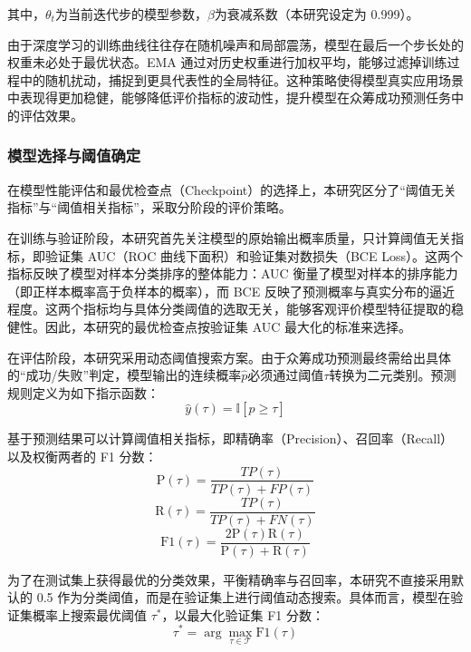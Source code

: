 其中，$ \theta_t $为当前迭代步的模型参数，$ \beta $为衰减系数（本研究设定为 0.999）。

由于深度学习的训练曲线往往存在随机噪声和局部震荡，模型在最后一个步长处的权重未必处于最优状态。EMA 通过对历史权重进行加权平均，能够过滤掉训练过程中的随机扰动，捕捉到更具代表性的全局特征。这种策略使得模型真实应用场景中表现得更加稳健，能够降低评价指标的波动性，提升模型在众筹成功预测任务中的评估效果。

\subsubsection{模型选择与阈值确定}

在模型性能评估和最优检查点（Checkpoint）的选择上，本研究区分了``阈值无关指标''与``阈值相关指标''，采取分阶段的评价策略。

在训练与验证阶段，本研究首先关注模型的原始输出概率质量，只计算阈值无关指标，即验证集 AUC（ROC 曲线下面积）和验证集对数损失（BCE Loss）。这两个指标反映了模型对样本分类排序的整体能力：AUC 衡量了模型对样本的排序能力（即正样本概率高于负样本的概率），而 BCE 反映了预测概率与真实分布的逼近程度。这两个指标均与具体分类阈值的选取无关，能够客观评价模型特征提取的稳健性。因此，本研究的最优检查点按验证集 AUC 最大化的标准来选择。

在评估阶段，本研究采用动态阈值搜索方案。由于众筹成功预测最终需给出具体的``成功/失败''判定，模型输出的连续概率$ \hat p $必须通过阈值$ \tau $转换为二元类别。预测规则定义为如下指示函数：
\begin{equation}
\hat{y}(\tau)=\mathbb{I}[\hat{p}\ge \tau]
\end{equation}

基于预测结果可以计算阈值相关指标，即精确率（Precision）、召回率（Recall）以及权衡两者的 F1 分数：
\begin{equation}
\text{P}(\tau)=\frac{TP(\tau)}{TP(\tau)+FP(\tau)}
\end{equation}
\begin{equation}
\text{R}(\tau)=\frac{TP(\tau)}{TP(\tau)+FN(\tau)}
\end{equation}
\begin{equation}
\text{F1}(\tau)=\frac{2\text{P}(\tau)\text{R}(\tau)}{\text{P}(\tau)+\text{R}(\tau)}
\end{equation}

为了在测试集上获得最优的分类效果，平衡精确率与召回率，本研究不直接采用默认的 0.5 作为分类阈值，而是在验证集上进行阈值动态搜索。具体而言，模型在验证集概率上搜索最优阈值 $ \tau ^* $，以最大化验证集 F1 分数：
\begin{equation}
\tau^*=\arg\max_{\tau\in\mathcal{T}}\text{F1}(\tau)
\end{equation}

